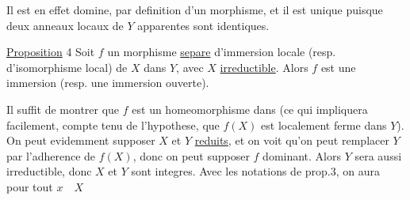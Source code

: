 Il est en effet domine, par definition d'un morphisme, et il est unique puisque deux anneaux locaux de \(Y\) apparentes sont identiques.

\uline{Proposition} 4 Soit \(f\) un morphisme \uline{separe} d'immersion locale (resp. d'isomorphisme local) de \(X\) dans \(Y\), avec  \(X\) \uline{irreductible}. Alors \(f\) est une immersion (resp. une immersion ouverte).

Il suffit de montrer que \(f\) est un homeomorphisme dans (ce qui impliquera facilement, compte tenu de l'hypothese, que \(f(X)\) est localement ferme dans \(Y\)). On peut evidemment supposer \(X\) et \(Y\) \uline{reduits}, et on voit qu'on peut remplacer \(Y\) par l'adherence de \(f(X)\), donc on peut supposer \(f\) dominant. Alors  \(Y\) sera aussi irreductible, donc \(X\) et \(Y\) sont integres. Avec les notations de prop.3, on aura pour tout \(x\quad X\)
